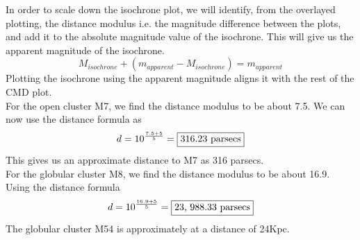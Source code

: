 \documentclass[12pt]{article}
\begin{document}
		In order to scale down the isochrone plot, we will identify, from the overlayed plotting, the distance modulus i.e. the magnitude difference between the plots, and add it to the absolute magnitude value of the isochrone. This will give us the apparent magnitude of the isochrone.\[M_{isochrone} + (m_{apparent} - M_{isochrone}) = m_{apparent}\]
		Plotting the isochrone using the apparent magnitude aligns it with the rest of the CMD plot.\\
		For the open cluster M7, we find the distance modulus to be about 7.5. We can now use the distance formula as
		\[d = 10^{\frac{7.5 + 5}{5}} = \framebox{316.23 parsecs}\]
		This gives us an approximate distance to M7 as 316 parsecs.\\
		For the globular cluster M8, we find the distance modulus to be about 16.9. Using the distance formula
		\[d = 10^{\frac{16.9 + 5}{5}} = \framebox{23, 988.33 parsecs}\]
		The globular cluster M54 is approximately at a distance of 24Kpc.
\end{document}
